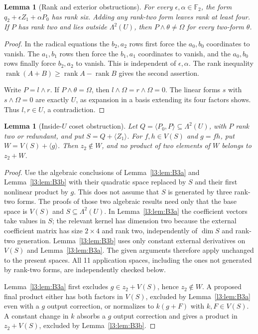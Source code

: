 \documentclass[11pt,a4paper]{article}
\theoremstyle{plain}
\newtheorem{lemma}[theorem]{Lemma}
\theoremstyle{remark}
\newcommand{\rk}{\operatorname{rank}}
\begin{document}
\begin{lemma}[Rank and exterior obstructions]\label{l2:lem:rankext}
For every $\epsilon,\alpha\in\mathbb F_2$, the form $q_2+\epsilon Z_1+\alpha P_0$ has rank six. Adding any rank-two form leaves rank at least four. If $P$ has rank two and lies outside $\Lambda^2(U)$, then $P\wedge\theta\ne\Omega$ for every two-form $\theta$.
\end{lemma}
\begin{proof}
In the radical equations the $b_2,a_2$ rows first force the $a_0,b_0$ coordinates to vanish. The $a_1,b_1$ rows then force the $b_1,a_1$ coordinates to vanish, and the $a_0,b_0$ rows finally force $b_2,a_2$ to vanish. This is independent of $\epsilon,\alpha$. The rank inequality $\rk(A+B)\ge\rk A-\rk B$ gives the second assertion.

Write $P=l\wedge r$. If $P\wedge\theta=\Omega$, then $l\wedge\Omega=r\wedge\Omega=0$. The linear forms $s$ with $s\wedge\Omega=0$ are exactly $U$, as expansion in a basis extending its four factors shows. Thus $l,r\in U$, a contradiction.
\end{proof}

\begin{lemma}[Inside-$U$ coset obstruction]\label{l2:lem:coset}
Let $Q=\langle P_0,P\rangle\subseteq\Lambda^2(U)$, with $P$ rank two or redundant, and put $S=Q+\langle Z_1\rangle$. For $f,h\in V(S)$ and $g=fh$, put $W=V(S)+\langle g\rangle$. Then $z_2\notin W$, and no product of two elements of $W$ belongs to $z_2+W$.
\end{lemma}
\begin{proof}
Use the algebraic conclusions of Lemma~\ref{l3:lem:B3a} and Lemma~\ref{l3:lem:B3b} with their quadratic space replaced by $S$ and their first nonlinear product by $g$. This does not assume that $S$ is generated by three rank-two forms. The proofs of those two algebraic results need only that the base space is $V(S)$ and $S\subseteq\Lambda^2(U)$. In Lemma~\ref{l3:lem:B3a} the coefficient vectors take values in $S$; the relevant kernel has dimension two because the external coefficient matrix has size $2\times4$ and rank two, independently of $\dim S$ and rank-two generation. Lemma~\ref{l3:lem:B3b} uses only constant external derivatives on $V(S)$ and Lemma~\ref{l3:lem:B3a}. The given arguments therefore apply unchanged to the present spaces. All 11 application spaces, including the ones not generated by rank-two forms, are independently checked below.

Lemma~\ref{l3:lem:B3a} first excludes $g\in z_2+V(S)$, hence $z_2\notin W$. A proposed final product either has both factors in $V(S)$, excluded by Lemma~\ref{l3:lem:B3a} even with a $g$ output correction, or normalizes to $k(g+F)$ with $k,F\in V(S)$. A constant change in $k$ absorbs a $g$ output correction and gives a product in $z_2+V(S)$, excluded by Lemma~\ref{l3:lem:B3b}.
\end{proof}
\end{document}

